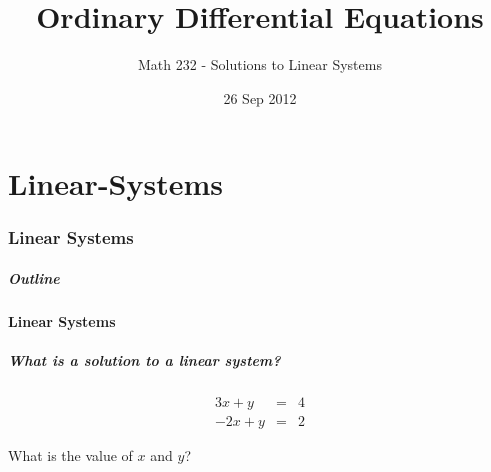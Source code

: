 \part{Linear-Systems}
\section{Linear Systems}

\title{Ordinary Differential Equations}
\subtitle{Math 232 - Solutions to Linear Systems}
\date{26 Sep 2012}

\begin{frame}
  \titlepage
\end{frame}

\begin{frame}
  \frametitle{Outline}
  \tableofcontents[ currentsection ]
\end{frame}


\subsection{Linear Systems}


\begin{frame}
  \frametitle{What is a solution to a linear system?}

  \begin{eqnarray*}
    3x + y & = & 4 \\
    -2x + y & = & 2
  \end{eqnarray*}

  What is the value of $x$ and $y$?


\end{frame}


